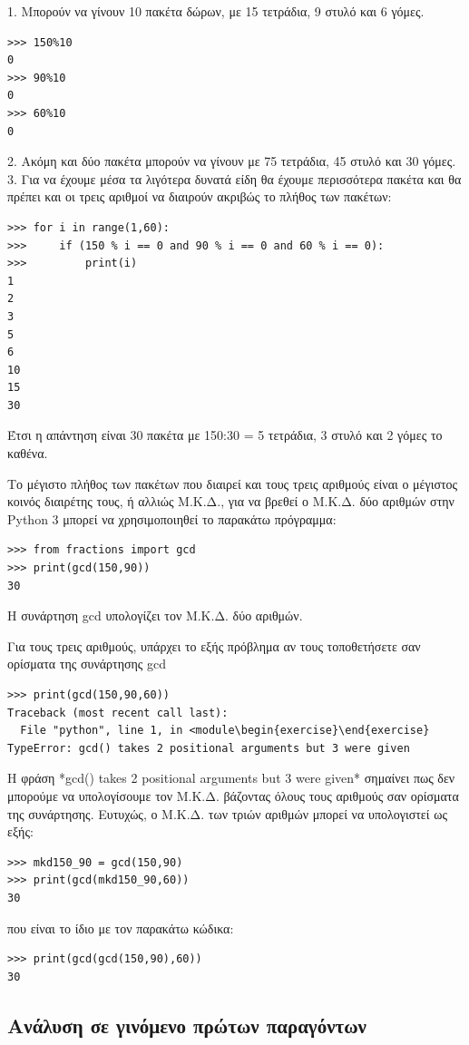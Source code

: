 1. Μπορούν να γίνουν 10 πακέτα δώρων, με 15 τετράδια, 9 στυλό και 6 γόμες. 
\begin{lstlisting}
>>> 150%10
0
>>> 90%10
0
>>> 60%10
0
\end{lstlisting}
2. Ακόμη και δύο πακέτα μπορούν να γίνουν με 75 τετράδια, 45 στυλό και 30 γόμες.
3. Για να έχουμε μέσα τα λιγότερα δυνατά είδη θα έχουμε περισσότερα πακέτα και θα πρέπει και οι τρεις αριθμοί να διαιρούν ακριβώς το πλήθος των πακέτων:
\begin{lstlisting}
>>> for i in range(1,60):
>>>     if (150 % i == 0 and 90 % i == 0 and 60 % i == 0):
>>>         print(i)
1
2
3
5
6
10
15
30
\end{lstlisting}
Έτσι η απάντηση είναι 30 πακέτα με 150:30 = 5 τετράδια, 3 στυλό και 2 γόμες το καθένα.

Το μέγιστο πλήθος των πακέτων που διαιρεί και τους τρεις αριθμούς είναι ο μέγιστος κοινός διαιρέτης τους, ή αλλιώς Μ.Κ.Δ., για να βρεθεί ο Μ.Κ.Δ. δύο αριθμών στην Python 3 μπορεί να χρησιμοποιηθεί το παρακάτω πρόγραμμα:
\begin{lstlisting}
>>> from fractions import gcd
>>> print(gcd(150,90))
30
\end{lstlisting}
Η συνάρτηση gcd υπολογίζει τον Μ.Κ.Δ. δύο αριθμών.

Για τους τρεις αριθμούς, υπάρχει το εξής πρόβλημα αν τους τοποθετήσετε σαν ορίσματα της συνάρτησης gcd
\begin{lstlisting}
>>> print(gcd(150,90,60))
Traceback (most recent call last):
  File "python", line 1, in <module\begin{exercise}\end{exercise}
TypeError: gcd() takes 2 positional arguments but 3 were given
\end{lstlisting}
Η φράση *gcd() takes 2 positional arguments but 3 were given* σημαίνει πως δεν μπορούμε να υπολογίσουμε τον Μ.Κ.Δ. βάζοντας όλους τους αριθμούς σαν ορίσματα της συνάρτησης. Ευτυχώς, ο Μ.Κ.Δ. των τριών αριθμών μπορεί να υπολογιστεί ως εξής:

\begin{lstlisting}
>>> mkd150_90 = gcd(150,90)
>>> print(gcd(mkd150_90,60))
30
\end{lstlisting}
που είναι το ίδιο με τον παρακάτω κώδικα:
\begin{lstlisting}
>>> print(gcd(gcd(150,90),60))
30
\end{lstlisting}

\subsection{Ανάλυση σε γινόμενο πρώτων παραγόντων}

